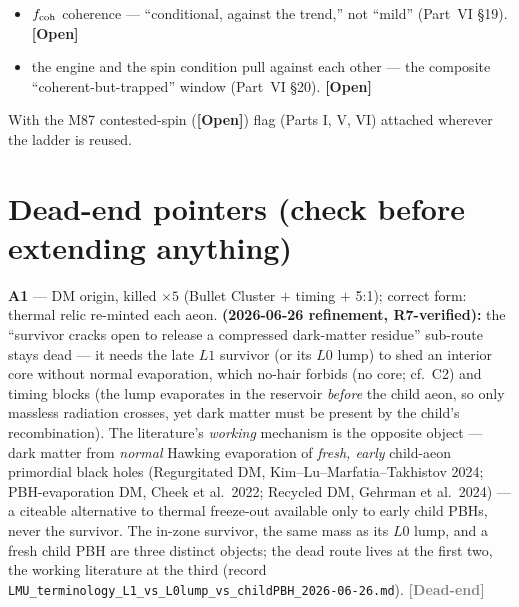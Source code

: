 \documentclass[11pt]{article}
\newcommand{\open}{\textcolor{red!70!black}{\textbf{[Open]}}}
\newcommand{\dead}{\textcolor{gray}{\textbf{[Dead-end]}}}
\begin{document}
\begin{itemize}[leftmargin=2.9em,itemsep=2pt]
\item[\textbf{(J3)}] $f_{\rm coh}$ coherence --- ``conditional, against the trend,'' not ``mild'' (Part~VI \S19). \open
\item[\textbf{(J4)}] the engine and the spin condition pull against each other --- the composite ``coherent-but-trapped'' window (Part~VI \S20). \open
\end{itemize}
With the M87 contested-spin (\open) flag (Parts I, V, VI) attached wherever the ladder is reused.

\section{Dead-end pointers (check before extending anything)}
\textbf{A1} --- DM origin, killed $\times5$ (Bullet Cluster $+$ timing $+$ 5:1); correct form: thermal relic re-minted each aeon. \textbf{(2026-06-26 refinement, R7-verified):} the ``survivor cracks open to release a compressed dark-matter residue'' sub-route stays dead --- it needs the late $L1$ survivor (or its $L0$ lump) to shed an interior core without normal evaporation, which no-hair forbids (no core; cf.\ C2) and timing blocks (the lump evaporates in the reservoir \emph{before} the child aeon, so only massless radiation crosses, yet dark matter must be present by the child's recombination). The literature's \emph{working} mechanism is the opposite object --- dark matter from \emph{normal} Hawking evaporation of \emph{fresh, early} child-aeon primordial black holes (Regurgitated DM, Kim--Lu--Marfatia--Takhistov 2024; PBH-evaporation DM, Cheek et al.\ 2022; Recycled DM, Gehrman et al.\ 2024) --- a citeable alternative to thermal freeze-out available only to early child PBHs, never the survivor. The in-zone survivor, the same mass as its $L0$ lump, and a fresh child PBH are three distinct objects; the dead route lives at the first two, the working literature at the third (record \texttt{LMU\_terminology\_L1\_vs\_L0lump\_vs\_childPBH\_2026-06-26.md}). \dead\quad
\end{document}
